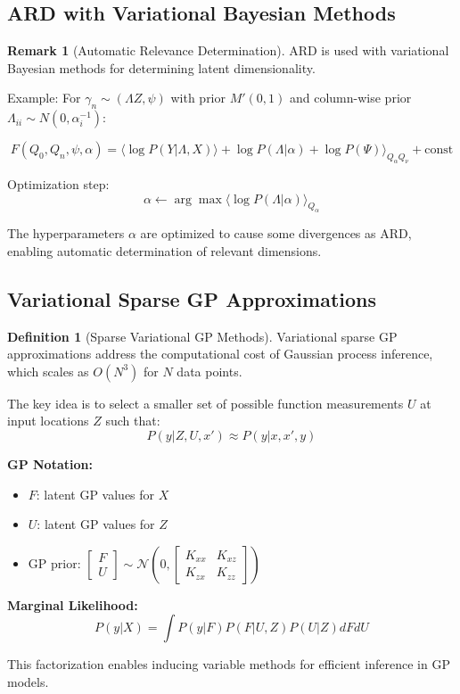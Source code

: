 \documentclass[12pt,a4paper]{article}
\theoremstyle{definition}
\newtheorem{definition}{Definition}[section]
\newtheorem{remark}{Remark}[section]
\begin{document}
\subsection{ARD with Variational Bayesian Methods}

\begin{remark}[Automatic Relevance Determination]
ARD is used with variational Bayesian methods for determining latent dimensionality.

Example: For $\gamma_n \sim (\Lambda Z, \psi)$ with prior $M'(0,1)$ and column-wise prior $\Lambda_{ii} \sim N(0, \alpha_i^{-1})$:

\[
F(Q_0, Q_n, \psi, \alpha) = \langle \log P(Y | \Lambda, X) \rangle + \log P(\Lambda | \alpha) + \log P(\Psi) \rangle_{Q_\alpha Q_\nu} + \text{const}
\]

Optimization step:
\[
\alpha \leftarrow \arg\max \langle \log P(\Lambda | \alpha) \rangle_{Q_\alpha}
\]

The hyperparameters $\alpha$ are optimized to cause some divergences as ARD, enabling automatic determination of relevant dimensions.
\end{remark}

\subsection{Variational Sparse GP Approximations}

\begin{definition}[Sparse Variational GP Methods]
Variational sparse GP approximations address the computational cost of Gaussian process inference, which scales as $O(N^3)$ for $N$ data points.

The key idea is to select a smaller set of possible function measurements $U$ at input locations $Z$ such that:
\[
P(y | Z, U, x') \approx P(y | x, x', y)
\]

\textbf{GP Notation:}
\begin{itemize}
    \item $F$: latent GP values for $X$
    \item $U$: latent GP values for $Z$
    \item GP prior: $\begin{bmatrix} F \\ U \end{bmatrix} \sim \mathcal{N}\left(0, \begin{bmatrix} K_{xx} & K_{xz} \\ K_{zx} & K_{zz} \end{bmatrix}\right)$
\end{itemize}

\textbf{Marginal Likelihood:}
\[
P(y | X) = \int P(y | F) P(F | U, Z) P(U | Z) dF dU
\]

This factorization enables inducing variable methods for efficient inference in GP models.
\end{definition}
\end{document}
